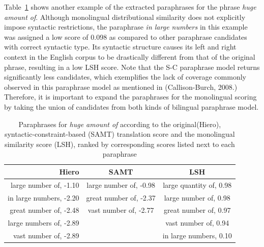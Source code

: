 \documentclass[11pt]{article}
\begin{document}
Table~\ref{table2} shows another example of the extracted paraphrases for the phrase {\em huge amount of}. Although monolingual distributional similarity does not explicitly impose syntactic restrictions, the paraphrase {\em in large numbers} in this example was assigned a low score of 0.098 as compared to other paraphrase candidates with correct syntactic type. Its syntactic structure causes its left and right context in the English corpus to be drastically different from that of the original phrase, resulting in a low LSH score. Note that the S-C paraphrase model returns significantly less candidates, which exemplifies the lack of coverage commonly observed in this paraphrase model as mentioned in (Callison-Burch, 2008.) Therefore, it is important to expand the paraphrases for the monolingual scoring by taking the union of candidates from both kinds of bilingual paraphrase model.

\begin{table}[t!]
\begin{center}
\begin{tabular}{rcc}%
\hline\hline 
\bf \small Hiero & \bf \small SAMT & \bf \small LSH \\ \hline
{\scriptsize large number of, -1.10} & {\scriptsize large number of, -0.98} & {\scriptsize large quantity of, 0.98} \\
{\scriptsize in large numbers, -2.20} & {\scriptsize great number of, -2.37} & {\scriptsize large number of, 0.98} \\
{\scriptsize great number of, -2.48}& {\scriptsize vast number of, -2.77}& {\scriptsize great number of, 0.97}\\
{\scriptsize large numbers of, -2.89} & & {\scriptsize vast number of, 0.94} \\
{\scriptsize vast number of, -2.89}& & {\scriptsize in large numbers, 0.10}\\
\hline
\end{tabular}
\end{center}
\caption{\label{table2} Paraphrases for {\em huge amount of} according to the original(Hiero), syntactic-constraint-based (SAMT) translation score and the monolingual similarity score (LSH), ranked by corresponding scores listed next to each paraphrase}
\end{table}

\end{document}
